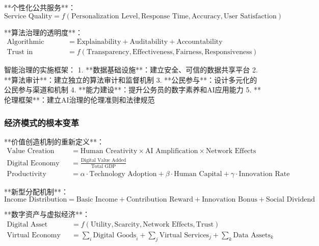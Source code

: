 **个性化公共服务**：
\begin{equation}
\text{Service Quality} = f(\text{Personalization Level}, \text{Response Time}, \text{Accuracy}, \text{User Satisfaction})
\end{equation}

**算法治理的透明度**：
\begin{align}
\text{Algorithmic Transparency} &= \text{Explainability} + \text{Auditability} + \text{Accountability} \\
\text{Trust in Government} &= f(\text{Transparency}, \text{Effectiveness}, \text{Fairness}, \text{Responsiveness})
\end{align}

\begin{center}
智能治理的实施框架：
1. **数据基础设施**：建立安全、可信的数据共享平台
2. **算法审计**：建立独立的算法审计和监督机制
3. **公民参与**：设计多元化的公民参与渠道和机制
4. **能力建设**：提升公务员的数字素养和AI应用能力
5. **伦理框架**：建立AI治理的伦理准则和法律规范
\end{center}

\subsubsection{经济模式的根本变革} %

**价值创造机制的重新定义**：
\begin{align}
\text{Value Creation} &= \text{Human Creativity} \times \text{AI Amplification} \times \text{Network Effects} \\
\text{Digital Economy Share} &= \frac{\text{Digital Value Added}}{\text{Total GDP}} \\
\text{Productivity Growth} &= \alpha \cdot \text{Technology Adoption} + \beta \cdot \text{Human Capital} + \gamma \cdot \text{Innovation Rate}
\end{align}

**新型分配机制**：
\begin{equation}
\text{Income Distribution} = \text{Basic Income} + \text{Contribution Reward} + \text{Innovation Bonus} + \text{Social Dividend}
\end{equation}

**数字资产与虚拟经济**：
\begin{align}
\text{Digital Asset Value} &= f(\text{Utility}, \text{Scarcity}, \text{Network Effects}, \text{Trust}) \\
\text{Virtual Economy Size} &= \sum_{i} \text{Digital Goods}_i + \sum_{j} \text{Virtual Services}_j + \sum_{k} \text{Data Assets}_k
\end{align}

